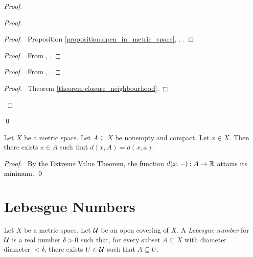 \begin{proof}
    \pf
    \begin{proof}
        \begin{proof}
            \pf\ Proposition \ref{proposition:open_in_metric_space}, ,
            .
        \end{proof}
        \begin{proof}
            \pf\ From , .
        \end{proof}
        \begin{proof}
            \pf\ From , .
        \end{proof}
        \qedstep
        \begin{proof}
            \pf\ Theorem \ref{theorem:closure_neighbourhood}.
        \end{proof}
    \end{proof}
    \qed
\end{proof}

\begin{theorem}
    Let $X$ be a metric space. Let $A \subseteq X$ be nonempty and compact.
    Let $x \in X$. Then there exists $a \in A$ such that $d(x,A) = d(x,a)$.
\end{theorem}

\begin{proof}
    \pf\ By the Extreme Value Theorem, the function $d(x,-) : A \rightarrow \mathbb{R}$ attains its minimum. \qed
\end{proof}

\section{Lebesgue Numbers}

\begin{definition}
    Let $X$ be a metric space. Let $\mathcal{U}$ be an open covering of $X$. A \emph{Lebesgue number}
    for $\mathcal{U}$ is a real number $\delta > 0$ such that, for every subset $A \subseteq X$ with diameter
    diameter $< \delta$, there exists $U \in \mathcal{U}$ such that $A \subseteq U$.
\end{definition}

